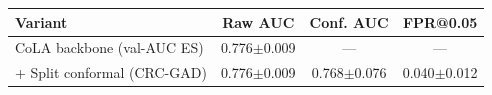 \begin{tabular}{lccc}
\toprule
\textbf{Variant} & \textbf{Raw AUC} & \textbf{Conf. AUC} & \textbf{FPR@0.05} \\
\midrule
CoLA backbone (val-AUC ES) & 0.776$\pm$0.009 & --- & --- \\
+ Split conformal (CRC-GAD) & 0.776$\pm$0.009 & 0.768$\pm$0.076 & 0.040$\pm$0.012 \\
\bottomrule
\end{tabular}
